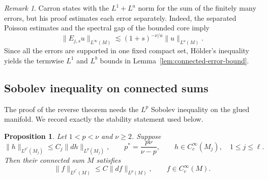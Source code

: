 \documentclass[12pt]{amsart}
\newcommand{\norm}[2]{\left\lVert #1\right\rVert_{#2}}
\newtheorem{proposition}[theorem]{Proposition}
\theoremstyle{remark}
\newtheorem{remark}[theorem]{Remark}
\begin{document}
\begin{remark}
Carron states \cite[Lemma~3.1]{Carron07} with the $L^1+L^a$ norm for the
sum of the finitely many errors, but his proof estimates each error
separately.  Indeed, the separated Poisson estimates
\cite[Lemma~2.4]{Carron07} and the spectral gap of the bounded core imply
\[
 \|E_{j,s}u\|_{L^\infty(M)}
 \lesssim (1+s)^{-\nu/a}\|u\|_{L^a(M)}.
\]
Since all the errors are supported in one fixed compact set, H\"older's
inequality yields the termwise $L^1$ and $L^b$ bounds in
Lemma~\ref{lem:connected-error-bound}.
\end{remark}




\subsection{Sobolev inequality on connected sums}

The proof of the reverse theorem needs the $L^p$ Sobolev inequality on the
glued manifold.  We record exactly the stability statement used below.



\begin{proposition}\label{prop:connected-Sobolev}
Let $1<p<\nu$ and $\nu\ge 2$. Suppose
\begin{equation}\label{eq:model-p-Sobolev}
 \|h\|_{L^{p^*}(M_j)}
 \leq C_j\|dh\|_{L^p(M_j)},
 \qquad p^*=\frac{p\nu}{\nu-p},
 \qquad h\in C_c^\infty(M_j),\quad 1\leq j\leq\ell.
\end{equation}
Then their connected sum $M$ satisfies
\begin{equation}\label{eq:sum-p-Sobolev}
 \|f\|_{L^{p^*}(M)}
 \leq C\|df\|_{L^p(M)},
 \qquad f\in C_c^\infty(M).
\end{equation}

\end{proposition}



\end{document}
